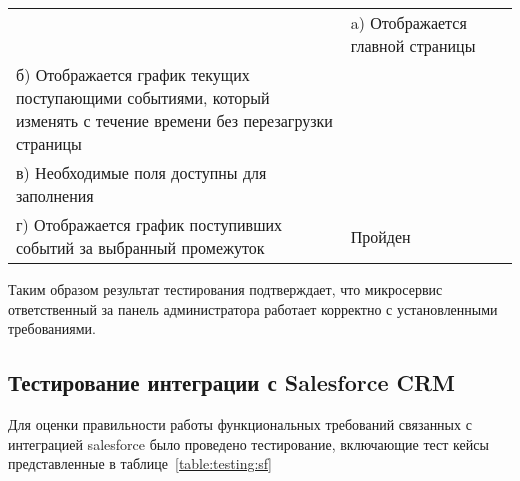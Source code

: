\begin{longtable}[l]{| >{\raggedright}m{}
                  | >{\raggedright}m{}
                  | >{\raggedright\arraybackslash}m{}|}
    & 

    a) Отображается главной страницы  \\
    б) Отображается график текущих поступающими событиями, который изменять с течение времени без перезагрузки страницы \\
    в) Необходимые поля доступны для заполнения \\
    г) Отображается график поступивших событий за выбранный промежуток 
    
    & 

    Пройден \\ \hline

  \hline

\end{longtable}


Таким образом результат тестирования подтверждает, что микросервис ответственный за панель администратора работает корректно с установленными требованиями.

\subsection{Тестирование интеграции с Salesforce CRM}
Для оценки правильности работы функциональных требований связанных с интеграцией salesforce было проведено тестирование, включающие тест кейсы представленные в таблице~\ref{table:testing:sf} 


